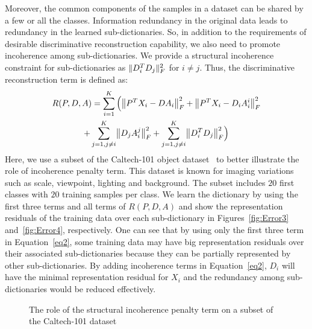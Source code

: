 \documentclass[journal]{IEEEtran}
\DeclarePairedDelimiter\norm{\lVert}{\rVert}
\begin{document}
Moreover, the common components of the samples in a dataset can be shared by a few or all the classes. Information redundancy in the original data leads to redundancy in the learned sub-dictionaries. So, in addition to the requirements of desirable discriminative reconstruction capability, we also need to promote incoherence among sub-dictionaries. We provide a structural incoherence constraint for sub-dictionaries as $\norm{D_i^T D_j}_{F}^2$ for $i \neq j$. Thus, the discriminative reconstruction term is defined as:
\begin{gather}
R(P,D,A) = \sum\limits_{i=1}^K \Big( \norm[\big]{P^T X_i - D A_i}_{F}^2 + \norm[\big]{P^T X_i - D_i A_i^i}_{F}^2
\label{eq2} \\ \notag
+ \sum_{\substack{j=1, j \neq i}}^K \norm[\big]{D_j A_i^j}_{F}^2 + \sum_{\substack{j=1, j \neq i}}^K \norm[\big]{D_i^T D_j}_{F}^2 \Big)
\end{gather}
Here, we use a subset of the Caltech-101 object dataset~\cite{Caltech} to better illustrate the role of incoherence penalty term. This dataset is known for imaging variations such as scale, viewpoint, lighting and background. The subset includes $20$ first classes with $20$ training samples per class. We learn the dictionary by using the first three terms and all terms of $R(P,D,A)$ and show the representation residuals of the training data over each sub-dictionary in Figures~\ref{fig:Error3} and~\ref{fig:Error4}, respectively. One can see that by using only the first three term in Equation~\eqref{eq2}, some training data may have big representation residuals over their associated sub-dictionaries because they can be partially represented by other sub-dictionaries. By adding incoherence terms in Equation~\eqref{eq2}, $D_i$ will have the minimal representation residual for $X_i$ and the redundancy among sub-dictionaries would be reduced effectively.
\begin{figure}[t]
\centering
{}
\hspace{6pt} 
\caption{The role of the structural incoherence penalty term on a subset of the Caltech-101 dataset}
\label{fig:Rep_Error}
\vspace{-1.5em}
\end{figure}
\end{document}
